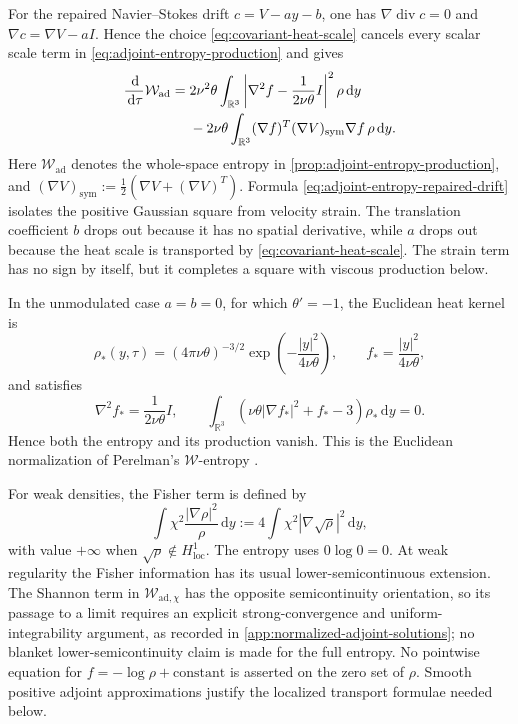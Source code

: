 \documentclass[11pt]{amsart}
\numberwithin{equation}{section}
\theoremstyle{plain}
\theoremstyle{definition}
\theoremstyle{remark}
\newcommand{\R}{\mathbb R}
\newcommand{\dd}{\,\mathrm d}
\newcommand{\diver}{\operatorname{div}}
\begin{document}
For the repaired Navier--Stokes drift \(c=V-ay-b\), one has
\(\nabla\diver c=0\) and
\(\nabla c=\nabla V-aI\).  Hence
the choice \eqref{eq:covariant-heat-scale} cancels every scalar scale term in
\eqref{eq:adjoint-entropy-production} and gives
\begin{align}
 \frac{\dd}{\dd\tau}\mathcal W_{\mathrm{ad}}
 ={}&2\nu^2\theta\int_{\R^3}
 \left|\nabla^2f-\frac{1}{2\nu\theta}I\right|^2\rho\dd y
 \notag\\
 &-2\nu\theta\int_{\R^3}
 (\nabla f)^{T}
 (\nabla V)_{\mathrm{sym}}
 \nabla f\,\rho\dd y.
 \label{eq:adjoint-entropy-repaired-drift}
\end{align}
Here \(\mathcal W_{\mathrm{ad}}\) denotes the whole-space entropy in
\cref{prop:adjoint-entropy-production}, and
\((\nabla V)_{\mathrm{sym}}
:=\tfrac12(\nabla V+(\nabla V)^{T})\).  Formula
\eqref{eq:adjoint-entropy-repaired-drift} isolates the positive Gaussian
square from velocity strain.  The translation coefficient \(b\) drops out
because it has no spatial derivative, while \(a\) drops out because the heat
scale is transported by \eqref{eq:covariant-heat-scale}.  The strain term has
no sign by itself, but it completes a square with viscous production below.

In the unmodulated case \(a=b=0\), for which \(\theta'=-1\), the Euclidean
heat kernel is
\begin{equation}\label{eq:heat-kernel}
 \rho_*(y,\tau)=(4\pi\nu\theta)^{-3/2}
 \exp\left(-\frac{|y|^2}{4\nu\theta}\right),
 \qquad f_*=\frac{|y|^2}{4\nu\theta},
\end{equation}
and satisfies
\[
 \nabla^2f_*=\frac{1}{2\nu\theta}I,
 \qquad
 \int_{\R^3}(\nu\theta|\nabla f_*|^2+f_*-3)\rho_*\dd y=0.
\]
Hence both the entropy and its production vanish.  This is the Euclidean
normalization of Perelman's \(\mathcal W\)-entropy \cite{Perelman2002}.

For weak densities, the Fisher term is defined by
\begin{equation}\label{eq:weak-fisher}
 \int\chi^2\frac{|\nabla\rho|^2}{\rho}\dd y
 :=4\int\chi^2|\nabla\sqrt\rho|^2\dd y,
\end{equation}
with value \(+\infty\) when \(\sqrt\rho\notin H^1_{\mathrm{loc}}\).
The entropy uses \(0\log0=0\).  At weak regularity the Fisher information has
its usual lower-semicontinuous extension.  The Shannon term in
\(\mathcal W_{\mathrm{ad},\chi}\) has the opposite semicontinuity orientation,
so its passage to a limit requires an explicit strong-convergence and
uniform-integrability argument, as recorded in
\cref{app:normalized-adjoint-solutions}; no blanket
lower-semicontinuity claim is made for the full entropy.  No pointwise equation for
\(f=-\log\rho+\text{constant}\) is asserted on the zero set of \(\rho\).
Smooth positive adjoint approximations justify the localized transport
formulae needed below.
\end{document}
